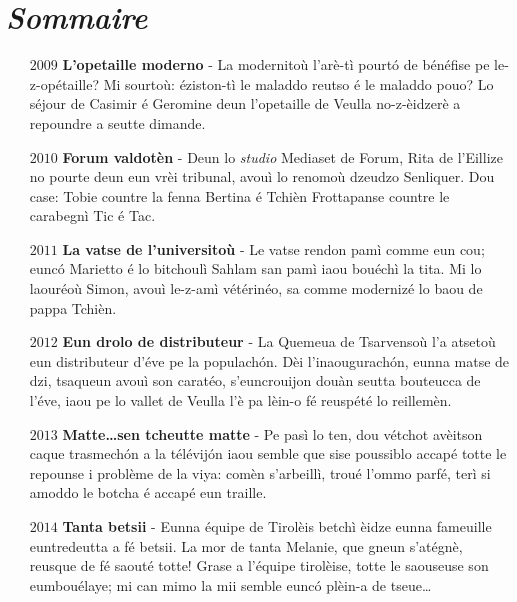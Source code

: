 \chapter*{\textit{Sommaire}}

\begin{itemize}
\item[$2009$] \textbf{L'opetaille moderno} - La modernitoù l'arè-tì pourt\'o de bénéfise pe le-z-opétaille? Mi sourtoù: éziston-tì le maladdo reutso é le maladdo pouo? Lo séjour de Casimir é Geromine deun l'opetaille de Veulla no-z-èidzerè a repoundre a seutte dimande.\newline
\item[$2010$] \textbf{Forum valdotèn} - Deun lo \textit{studio} Mediaset de Forum, Rita de l'Eillize no pourte deun eun vrèi tribunal, avouì lo renomoù dzeudzo Senliquer. Dou case: Tobie countre la fenna Bertina é Tchièn Frottapanse countre le carabegnì Tic é Tac.\newline

\item[$2011$] \textbf{La vatse de l'universitoù} - Le vatse rendon pamì com\-me eun cou; eunc\'o Marietto é lo bitchoulì Sahlam san pamì iaou bouéchì la tita. Mi lo laouréoù Simon, avouì le-z-amì vétérinéo, sa comme modernizé lo baou de pappa Tchièn. \newline

\item[$2012$] \textbf{Eun drolo de distributeur} - La Quemeua de Tsarvensoù l'a atsetoù eun distributeur d'éve pe la populach\'on. Dèi l'inaougurach\'on, eunna matse de dzi, tsaqueun avouì son caratéo, s'euncrouijon douàn seutta bouteucca de l'éve, iaou pe lo vallet de Veulla l'è pa lèin-o fé reuspété lo reillemèn.
\newline

\item[$2013$] \textbf{Matte\ldots sen tcheutte matte} - Pe pasì lo ten, dou vé\-tchot avèitson caque trasmech\'on a la télévij\'on iaou sem\-ble que sise poussiblo accapé totte le repounse i problème de la viya: comèn s'arbeillì, troué l'ommo parfé, terì si amoddo le bo\-tcha é accapé eun traille.\newline

\item[$2014$] \textbf{Tanta betsii} - Eunna équipe de Tirolèis betchì èidze eunna fameuille euntredeutta a fé betsii. La mor de tanta Melanie, que gneun s'atégnè, reusque de fé saouté totte! Grase a l'équipe tirolèise, totte le saouseuse son eumbouélaye; mi can mimo la mii semble eunc\'o plèin-a de tseue\ldots\newline


\end{itemize}
